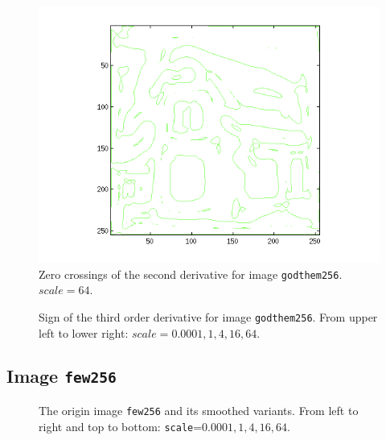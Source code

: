 \begin{figure}[H]
	\centering
	\includegraphics[scale=0.8]{./images/Q4/vv/64.png}
	\caption{Zero crossings of the second derivative for image \texttt{godthem256}. $scale = 64$.}
	\label{fig:Q4_vv_64}
\end{figure}


\begin{figure}[H]
	\centering
	\scalebox{0.6}{}
	\caption{Sign of the third order derivative for image \texttt{godthem256}. From upper left to lower right: $scale = 0.0001, 1, 4, 16, 64$.}
	\label{fig:Q4_vvv_}
\end{figure}


\subsection{Image \texttt{few256}}

\begin{figure}[H]
	\centering
  \scalebox{0.8}{}
  \caption{The origin image \texttt{few256} and its smoothed variants.
    From left to right and top to bottom: \texttt{scale}=$0.0001, 1, 4, 16, 64$.}
	\label{fig:Q5_smoothed_few256}
\end{figure}

